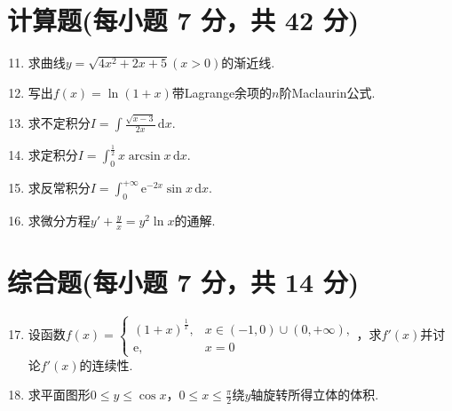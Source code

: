 \documentclass[../main.tex]{subfiles}
\begin{document}
\section{计算题(每小题 7 分，共 42 分)}
\begin{enumerate}
    \setcounter{enumi}{10}
    \item 求曲线$y=\sqrt{4x^{2}+2x+5}(x>0)$的渐近线.
          \vspace{12em}

    \item 写出$f(x)=\ln(1+x)$带Lagrange余项的$n$阶Maclaurin公式.
          \vspace{12em}

    \item 求不定积分$I=\int \frac{\sqrt{x-3}}{2x}\,\mathrm{d}x$.
          \vspace{12em}

    \item 求定积分$I=\int_{0}^{\frac{1}{2}}x\arcsin x\,\mathrm{d}x$.
          \vspace{11em}

    \item 求反常积分$I= \int_{0}^{+\infty}\mathrm{e}^{-2x}\sin x\,\mathrm{d}x$.
          \vspace{12em}

    \item 求微分方程$y'+\frac{y}{x}=y^{2}\ln x$的通解.
          \vspace{12em}
\end{enumerate}

\section{综合题(每小题 7 分，共 14 分)}
\begin{enumerate}
    \setcounter{enumi}{16}
    \item 设函数$f(x)=
              \begin{cases}
                  (1+x)^{\frac{1}{x}}, & x\in(-1,0)\cup(0,+\infty), \\
                  \mathrm{e},          & x=0
              \end{cases}$，求$f'(x)$并讨论$f'(x)$的连续性.
          \vspace{12em}

    \item 求平面图形$0\leq y\leq \cos x$，$0\leq x\leq \frac{\pi}{2}$绕$y$轴旋转所得立体的体积.
          \vspace{15em}
\end{enumerate}
\end{document}
